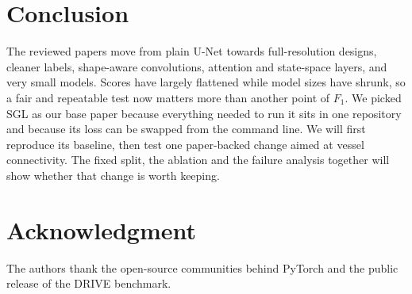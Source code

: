\documentclass[conference]{IEEEtran}
\begin{document}
\section{Conclusion}

The reviewed papers move from plain U-Net towards full-resolution designs,
cleaner labels, shape-aware convolutions, attention and state-space layers, and
very small models. Scores have largely flattened while model sizes have shrunk,
so a fair and repeatable test now matters more than another point of $F_1$. We
picked SGL as our base paper because everything needed to run it sits in one
repository and because its loss can be swapped from the command line. We will
first reproduce its baseline, then test one paper-backed change aimed at vessel
connectivity. The fixed split, the ablation and the failure analysis together
will show whether that change is worth keeping.

\section*{Acknowledgment}
The authors thank the open-source communities behind PyTorch and the public
release of the DRIVE benchmark.
\end{document}
